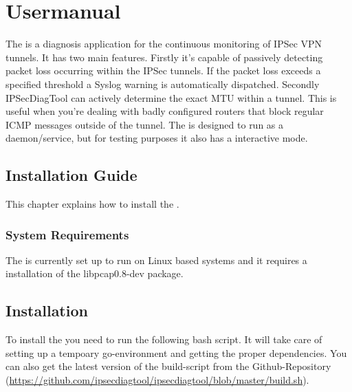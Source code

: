 \chapter{Usermanual}
\label{chap:Usermanual}
The \tool is a diagnosis application for the continuous monitoring of \acs{IPSec} \acs{VPN} tunnels. It has two main features. Firstly it's capable of passively detecting packet loss occurring within the \acs{IPSec} tunnels. If the packet loss exceeds a specified threshold a Syslog warning is automatically dispatched. Secondly IPSecDiagTool can actively determine the exact \acs{MTU} within a tunnel. This is useful when you're dealing with badly configured routers that block regular \acs{ICMP} messages outside of the tunnel. The \tool is designed to run as a daemon/service, but for testing purposes it also has a interactive mode.

\section{Installation Guide}
This chapter explains how to install the \tool.

\subsection{System Requirements}
The \tool is currently set up to run on Linux based systems and it requires a installation of the libpcap0.8-dev package. 


\section{Installation}
To install the \tool you need to run the following bash script. It will take care of setting up a tempoary go-environment and getting the proper dependencies. You can also get the latest version of the build-script from the Github-Repository (\url{https://github.com/ipsecdiagtool/ipsecdiagtool/blob/master/build.sh}).

